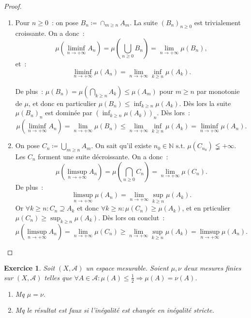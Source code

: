 \documentclass{article}
\newtheorem{ex}{Exercice}[section]
\theoremstyle{definition}
\newcommand{\pinfty}{{+\infty}}
\newcommand{\st}{\text{ s.t. }}
\newcommand{\N}{{\mathbb N}}
\begin{document}
\begin{proof}~
\begin{enumerate}
	\item Pour $n \geq 0$~: on pose $B_n \coloneqq \cap_{m \geq n}A_m$. La suite $(B_n)_{n \geq 0}$ est trivialement croissante. On a donc~:
	\[\mu\left(\liminf_{n \to \pinfty}A_n\right) = \mu\left(\bigcup_{n \geq 0}B_n\right) = \lim_{n \to \pinfty}\mu(B_n),\]
	et~:
	\[\liminf_{n \to \pinfty}\mu(A_n) = \lim_{n \to \pinfty}\inf_{k \geq n}\mu(A_k).\]

	De plus~: $\mu(B_n) = \mu\left(\bigcap_{k \geq n}A_k\right) \leq \mu(A_m)$ pour $m \geq n$ par monotonie de $\mu$, et donc en particulier $\mu(B_n) \leq \inf_{k \geq n}\mu(A_k)$.
	Dès lors la suite $\mu(B_n)_n$ est dominée par $(\inf_{k \geq n}\mu(A_k))_n$. Dès lors~:
	\[\mu\left(\liminf_{n \to \pinfty}A_n\right) = \lim_{n \to \pinfty}\mu(B_n) \leq \lim_{n \to \pinfty}\inf_{k \geq n}\mu(A_k) = \liminf_{n \to \pinfty}\mu(A_n).\]
	\item On pose $C_n \coloneqq \bigcup_{m \geq n}A_m$. On sait qu'il existe $n_0 \in \N \st \mu\left(C_{n_0}\right) \lneqq \pinfty$. Les $C_n$ forment une suite décroissante.
	On a donc~:
	\[\mu\left(\limsup_{n \to \pinfty}A_n\right) = \mu\left(\bigcap_{n \geq 0}C_n\right) = \lim_{n \to \pinfty}\mu(C_n).\]
	De plus~:
	\[\limsup_{n \to \pinfty}\mu(A_n) = \lim_{n \to \pinfty}\sup_{k \geq n}\mu(A_k).\]
	Or $\forall k \geq n : C_n \supseteq A_k$ et donc $\forall k \geq n : \mu(C_n) \geq \mu(A_k)$, et en prticulier $\mu(C_n) \geq \sup_{k \geq n}\mu(A_k)$. Dès lors on conclut~:
	\[\mu\left(\limsup_{n \to \pinfty}A_n\right) = \lim_{n \to \pinfty}\mu(C_n) \geq \lim_{n \to \pinfty}\sup_{k \geq n}\mu(A_k) = \limsup_{n \to \pinfty}\mu(A_n).\]
\end{enumerate}
\end{proof}

\begin{ex} Soit $(X, \mathcal A)$ un espace mesurable. Soient $\mu, \nu$ deux mesures finies sur $(X, \mathcal A)$ telles que
$\forall A \in \mathcal A : \mu(A) \leq \frac 12 \Rightarrow \mu(A) = \nu(A)$.
\begin{enumerate}
	\item Mq $\mu = \nu$.
	\item Mq le résultat est faux si l'inégalité est changée en inégalité stricte.
\end{enumerate}
\end{ex}
\end{document}
